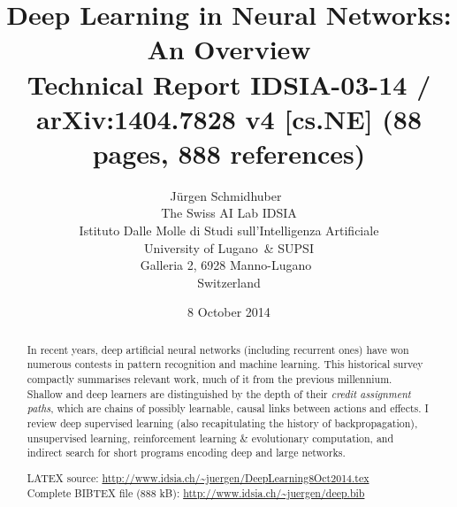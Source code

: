 \documentclass[letterpaper]{article}
\begin{document}
\title{Deep Learning in  Neural Networks: An Overview  \\
{\small Technical Report IDSIA-03-14 / arXiv:1404.7828 v4 [cs.NE] (88 pages, 888 references)}}

\date{8 October 2014}
\author{J\"{u}rgen Schmidhuber~\\
The Swiss AI Lab IDSIA \\
Istituto Dalle Molle di Studi sull'Intelligenza  Artificiale\\
University of Lugano~\& SUPSI \\
Galleria 2, 6928 Manno-Lugano~\\
Switzerland}
\maketitle


\begin{abstract}
In recent years, deep artificial neural networks (including recurrent ones) have won numerous contests in pattern recognition and machine learning.
This historical survey compactly summarises relevant work, much of it from the previous millennium. Shallow and deep learners are distinguished by the depth of their {\em credit assignment paths}, which are chains of possibly learnable, causal links between 
actions and effects. I review deep supervised learning (also recapitulating the history of backpropagation), unsupervised learning, reinforcement learning \& evolutionary computation, and indirect search for short programs encoding deep and large networks.

\vspace{7mm}
\noindent
LATEX source: \url{http://www.idsia.ch/~juergen/DeepLearning8Oct2014.tex} \\
Complete BIBTEX file (888 kB): \url{http://www.idsia.ch/~juergen/deep.bib}

\end{abstract}

\end{document}
